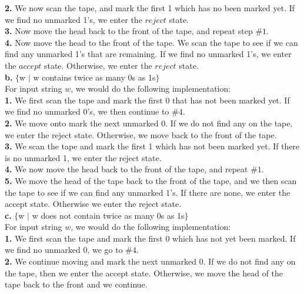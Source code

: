 \documentclass[12pt]{article}
\begin{document}
\textbf{2.} We now scan the tape, and mark the first 1 which has no been
marked yet. If we find no unmarked 1's, we enter the $reject$ state. \\

\textbf{3.} Now move the head back to the front of the tape, and repeat
step $\# 1$. \\

\textbf{4.} Now move the head to the front of the tape. We scan the tape
to see if we can find any unmarked 1's that are remaining. If we find no
unmarked 1's, we enter the $accept$ state. Otherwise, we enter the $reject$
state. \\

\textbf{b.} $\{$w $\mid$ w contains twice as many 0s as 1s$\}$ \\

For input string $w$, we would do the following implementation: \\
\textbf{1.} We first scan the tape and mark the first 0 that has not been marked yet.
If we find no unmarked 0's, we then continue to $\#4$. \\

\textbf{2.} We move onto mark the next unmarked 0. If we do not find any on the tape,
we enter the reject state. Otherwise, we move back to the front of the tape. \\

\textbf{3.} We scan the tape and mark the first 1 which has not been marked yet. If there
is no unmarked 1, we enter the reject state. \\

\textbf{4.} We now move the head back to the front of the tape, and repeat $\#1$. \\

\textbf{5.} We move the head of the tape back to the front of the tape, and we then scan
the tape to see if we can find any unmarked 1's. If there are none, we enter the
accept state. Otherwise we enter the reject state. \\

\textbf{c.} $\{$w $\mid$ w does not contain twice as many 0s as 1s$\}$ \\

For input string $w$, we would do the following implementation: \\
\textbf{1.} We first scan the tape and mark the first 0 which has not yet been marked.
If we find no unmarked 0, we go to $\#4$. \\

\textbf{2.} We continue moving and mark the next unmarked 0. If we do not find any on
the tape, then we enter the accept state. Otherwise, we move the head of the tape back
to the front and we continue. \\
\end{document}
